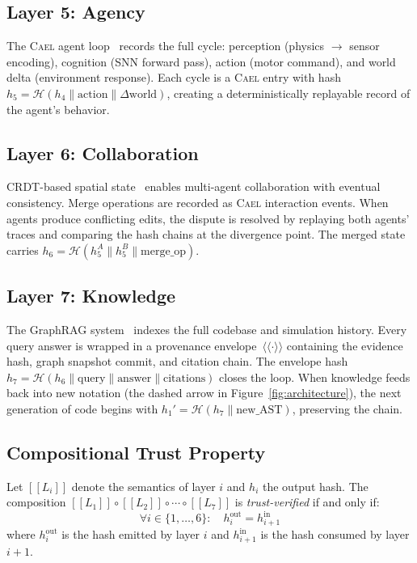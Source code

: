 \documentclass[sigchi-a]{acmart}
\providecommand{\llbracket}{[\![}
\providecommand{\rrbracket}{]\!]}
\newcommand{\cael}{\textsc{Cael}}
\newcommand{\hashfn}{\mathcal{H}}
\newcommand{\sem}[1]{\llbracket #1 \rrbracket}
\newcommand{\prov}[1]{\langle\!\langle #1 \rangle\!\rangle}
\begin{document}
\subsection{Layer 5: Agency}

The \cael{} agent loop~\cite{cael-paper} records the full cycle:
perception (physics $\to$ sensor encoding), cognition (SNN forward pass),
action (motor command), and world delta (environment response). Each cycle
is a \cael{} entry with hash
$h_5 = \hashfn(h_4 \| \text{action} \| \Delta\text{world})$,
creating a deterministically replayable record of the agent's behavior.

\subsection{Layer 6: Collaboration}

CRDT-based spatial state~\cite{crdt-paper} enables multi-agent collaboration
with eventual consistency. Merge operations are recorded as \cael{} interaction
events. When agents produce conflicting edits, the dispute is resolved by
replaying both agents' traces and comparing the hash chains at the divergence
point. The merged state carries
$h_6 = \hashfn(h_5^{A} \| h_5^{B} \| \text{merge\_op})$.

\subsection{Layer 7: Knowledge}

The GraphRAG system~\cite{graphrag-paper} indexes the full codebase and
simulation history. Every query answer is wrapped in a provenance
envelope~$\prov{\cdot}$ containing the evidence hash, graph snapshot commit,
and citation chain. The envelope hash
$h_7 = \hashfn(h_6 \| \text{query} \| \text{answer} \| \text{citations})$
closes the loop. When knowledge feeds back into new notation (the dashed
arrow in Figure~\ref{fig:architecture}), the next generation of code begins
with $h_1' = \hashfn(h_7 \| \text{new\_AST})$, preserving the chain.

\subsection{Compositional Trust Property}

\begin{definition}
\label{def:compositional-trust}
Let $\sem{L_i}$ denote the semantics of layer $i$ and $h_i$ the output hash.
The composition $\sem{L_1} \circ \sem{L_2} \circ \cdots \circ \sem{L_7}$ is
\emph{trust-verified} if and only if:
\[
  \forall i \in \{1, \ldots, 6\}: \quad
  h_i^{\text{out}} = h_{i+1}^{\text{in}}
\]
where $h_i^{\text{out}}$ is the hash emitted by layer $i$ and
$h_{i+1}^{\text{in}}$ is the hash consumed by layer $i{+}1$.
\end{definition}
\end{document}
